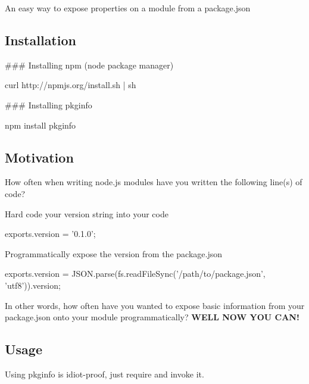 An easy way to expose properties on a module from a package.\+json

\subsection*{Installation}

\#\#\# Installing npm (node package manager) 
\begin{DoxyCode}
curl http://npmjs.org/install.sh | sh
\end{DoxyCode}


\#\#\# Installing pkginfo 
\begin{DoxyCode}
[sudo] npm install pkginfo
\end{DoxyCode}


\subsection*{Motivation}

How often when writing node.\+js modules have you written the following line(s) of code?


\begin{DoxyItemize}
\item Hard code your version string into your code
\end{DoxyItemize}


\begin{DoxyCode}
exports.version = '0.1.0';
\end{DoxyCode}



\begin{DoxyItemize}
\item Programmatically expose the version from the package.\+json
\end{DoxyItemize}


\begin{DoxyCode}
exports.version = JSON.parse(fs.readFileSync('/path/to/package.json', 'utf8')).version;
\end{DoxyCode}


In other words, how often have you wanted to expose basic information from your package.\+json onto your module programmatically? {\bfseries W\+E\+LL N\+OW Y\+OU C\+A\+N!}

\subsection*{Usage}

Using {\ttfamily pkginfo} is idiot-\/proof, just require and invoke it.



